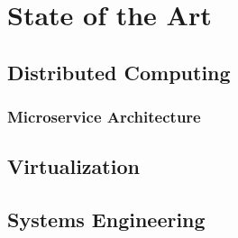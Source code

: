 \chapter{State of the Art}
\section{Distributed Computing}
\subsection{Microservice Architecture}

\section{Virtualization}

\section{Systems Engineering}
